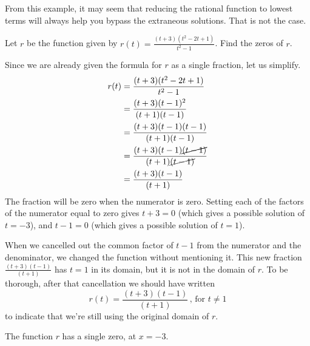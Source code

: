 \documentclass[nooutcomes]{ximera}
\begin{document}
	From this example, it may seem that reducing the rational function to lowest terms will always help you bypass the extraneous solutions. 
	That is not the case.
	
	\begin{example}

		Let $r$ be the function given by $r(t) = \frac{(t+3)(t^2-2t+1)}{t^2-1}$. Find the zeros of $r$.
	
		\begin{explanation}

			Since we are already given the formula for $r$ as a single fraction, let us simplify.
			\begin{align*}
				r(t) &= \frac{(t+3)(t^2-2t+1)}{t^2-1}\\
					&= \frac{(t+3)(t-1)^2}{(t+1)(t-1)}\\
					&= \frac{(t+3)(t-1)(t-1)}{(t+1)(t-1)}\\
					&= \frac{(t+3)(t-1)\cancel{(t-1)}}{(t+1)\cancel{(t-1)}}\\
					&= \frac{(t+3)(t-1)}{(t+1)}
			\end{align*}
			The fraction will be zero when the numerator is zero. Setting each of the factors of the numerator equal to zero gives
			$t+3=0$ (which gives a possible solution of $t=-3$), and $t-1=0$ (which gives a possible solution of $t=1$).
			
			When we cancelled out the common factor of $t-1$ from the numerator and the denominator, we changed the function without 
			mentioning it. This new fraction $\frac{(t+3)(t-1)}{(t+1)}$ has $t=1$ in its domain, but it is not in the domain of $r$. 
			To be thorough, after that cancellation we should have written
			$$ r(t) = \frac{(t+3)(t-1)}{(t+1)}  \, \text{, for } t \neq 1 $$
			to indicate that we're still using the original domain of $r$.
			
			The function $r$ has a single zero, at $x=-3$.
			
		\end{explanation}
	\end{example}
	
	
\end{document}
